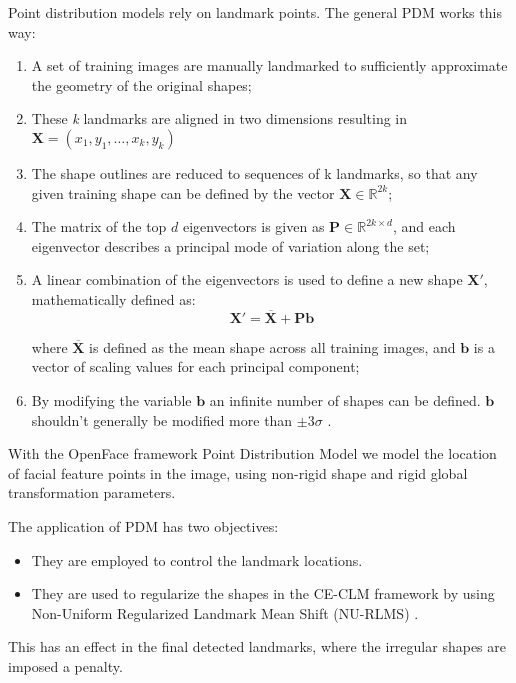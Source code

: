 Point distribution models rely on landmark points. The general PDM works this way:
\begin{enumerate}
	\item A set of training images are manually landmarked to sufficiently approximate the geometry of the original shapes;
	\item These \textit{k} landmarks are aligned in two dimensions resulting in \\
	$\mathbf{X} = (x_1,y_1, \dots, x_k, y_k)$
	\item The shape outlines are reduced to sequences of k landmarks, so that any given training shape can be defined by the vector $\mathbf{X} \in {\mathbb{R} ^{2k}}$;
	\item The matrix of the top $d$ eigenvectors is given as $\mathbf{P} \in \mathbb{R}^{2k \times d}$, and each eigenvector describes a principal mode of variation along the set;
	\item A linear combination of the eigenvectors is used to define a new shape $ \mathbf{X} '$, mathematically defined as: 
	\begin{equation}
	\mathbf {X}' = {\overline {\mathbf {X}} + \mathbf{P} \mathbf{b}}
	\end{equation}
	
	where $ {\overline {\mathbf {X}}}$ is defined as the mean shape across all training images, and $\mathbf {b}$ is a vector of scaling values for each principal component; 
	\item By modifying the variable $\mathbf {b}$  an infinite number of shapes can be defined. $\mathbf {b}$ shouldn't generally be modified more than $\pm3\sigma$ \cite{wiki:PDM}.
\end{enumerate}

With the OpenFace framework Point Distribution Model \cite{PDM_RLMS} we model the location of facial feature points in the image, using non-rigid shape and rigid global transformation parameters.

The application of PDM has two objectives:

\begin{itemize}
	\item They are employed to control the landmark locations.
	\item They are used to regularize the shapes in the CE-CLM framework by using Non-Uniform Regularized Landmark Mean Shift (NU-RLMS) \cite{Baltru2013}.
\end{itemize}
This has an effect in the final detected landmarks, where the irregular shapes are imposed a penalty.

